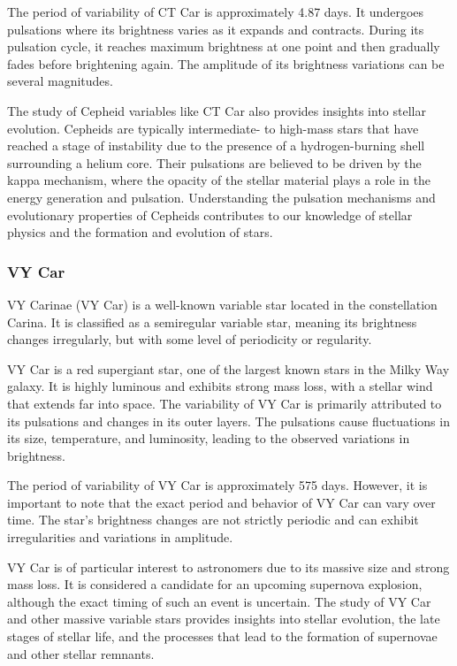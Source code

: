 The period of variability of CT Car is approximately 4.87 days. It undergoes pulsations where its brightness varies as it expands and contracts. During its pulsation cycle, it reaches maximum brightness at one point and then gradually fades before brightening again. The amplitude of its brightness variations can be several magnitudes.

The study of Cepheid variables like CT Car also provides insights into stellar evolution. Cepheids are typically intermediate- to high-mass stars that have reached a stage of instability due to the presence of a hydrogen-burning shell surrounding a helium core. Their pulsations are believed to be driven by the kappa mechanism, where the opacity of the stellar material plays a role in the energy generation and pulsation. Understanding the pulsation mechanisms and evolutionary properties of Cepheids contributes to our knowledge of stellar physics and the formation and evolution of stars.

\subsubsection*{ VY Car }
VY Carinae (VY Car) is a well-known variable star located in the constellation Carina. It is classified as a semiregular variable star, meaning its brightness changes irregularly, but with some level of periodicity or regularity.

VY Car is a red supergiant star, one of the largest known stars in the Milky Way galaxy. It is highly luminous and exhibits strong mass loss, with a stellar wind that extends far into space. The variability of VY Car is primarily attributed to its pulsations and changes in its outer layers. The pulsations cause fluctuations in its size, temperature, and luminosity, leading to the observed variations in brightness.

The period of variability of VY Car is approximately 575 days. However, it is important to note that the exact period and behavior of VY Car can vary over time. The star's brightness changes are not strictly periodic and can exhibit irregularities and variations in amplitude.

VY Car is of particular interest to astronomers due to its massive size and strong mass loss. It is considered a candidate for an upcoming supernova explosion, although the exact timing of such an event is uncertain. The study of VY Car and other massive variable stars provides insights into stellar evolution, the late stages of stellar life, and the processes that lead to the formation of supernovae and other stellar remnants.

